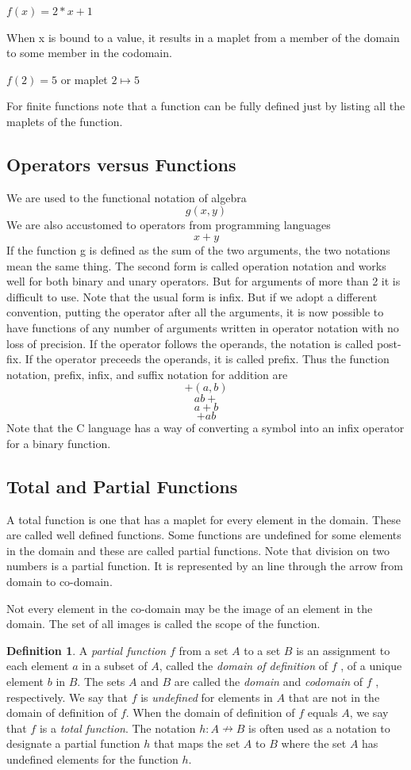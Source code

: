 \documentclass[11pt]{book} %
\theoremstyle {definition}
\newtheorem {definition}{Definition}[section]
\theoremstyle {remark}
\begin{document}
$f(x) = 2*x + 1$

When x is bound to a value, it results in a maplet from a member of the domain to some member in the codomain.

$f(2)=5$
or maplet $2 \mapsto 5$

For finite functions note that a function can be fully defined just by listing all the maplets of the function.

\subsection {Operators versus Functions}
We are used to the functional notation of algebra
$$  g(x,y)$$
We are also accustomed to operators from programming languages
$$x+y$$
If the function g is defined as the sum of the two arguments, the two notations mean the same thing. The second form is called operation notation and works well for both binary and unary operators. But for arguments of more than 2 it is difficult to use. Note that the usual form is infix. But if we adopt a different convention, putting the operator after all the arguments, it is now possible to have functions of any number of arguments written in operator notation with no loss of precision. If the operator follows the operands, the notation is called post-fix. If the operator preceeds the operands, it is called prefix. Thus the function notation, prefix, infix, and suffix notation for addition are
$$+(a,b)$$
$$ab+$$
$$a+b$$
$$+ab$$
Note that the C language has a way of converting a symbol into an infix operator for a binary function.

\subsection {Total and Partial Functions}
A total function is one that has a maplet for every element in the domain. These are called well defined functions. Some functions are undefined for some elements in the domain and these are called partial functions. Note that division on two numbers is a partial function. It is represented by an line through the arrow from domain to co-domain.

Not every element in the co-domain may be the image of an element in the domain. The set of all images is called the scope of the function.

\begin{definition}
A \textit{partial function} $f$ from a set $A$ to a set $B$ is an assignment to each element $a$ in a subset of $A$, called the \textit{domain of definition} of $f$ , of a unique element $b$ in $B$. The sets $A$ and $B$ are called the \textit{domain} and \textit{codomain} of $f$ , respectively. We say that $f$ is \textit{undefined} for elements in $A$ that are not in the domain of definition of $f$. When the domain of definition of $f$ equals $A$, we say that $f$ is a \textit{total function}. The notation $h:A \nrightarrow B$ is often used as a notation to designate a partial function $h$ that maps the set $A$ to $B$ where the set $A$ has undefined elements for the function $h$.
\end{definition}
\end{document}
